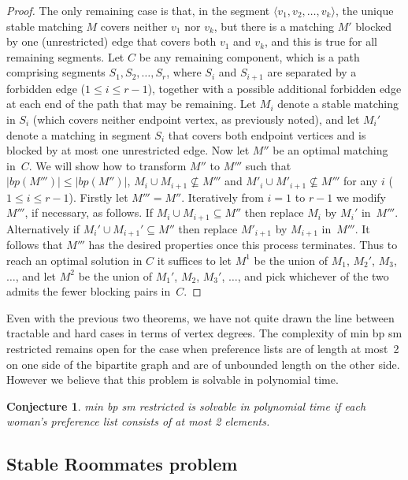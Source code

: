 \documentclass[preprint,12pt]{elsarticle}
\newtheorem{conj}[theorem]{Conjecture}
\begin{document}
\begin{proof}
The only remaining case is that, in the segment $\langle v_1,v_2,\dots,v_k\rangle$, the unique stable matching $M$ covers neither $v_1$ nor $v_k$, but there is a matching $M'$ blocked by one (unrestricted) edge that covers both $v_1$ and $v_k$, and this is true for all remaining segments. Let $C$ be any remaining component, which is a path comprising segments $S_1,S_2,\dots,S_r$, where $S_i$ and $S_{i+1}$ are separated by a forbidden edge ($1\leq i\leq r-1$), together with a possible additional forbidden edge at each end of the path that may be remaining.  Let $M_i$ denote a stable matching in $S_i$ (which covers neither endpoint vertex, as previously noted), and let $M_i'$ denote a matching in segment $S_i$ that covers both endpoint vertices and is blocked by at most one unrestricted edge. Now let $M''$ be an optimal matching in~$C$. We will show how to transform $M''$ to $M'''$ such that $|bp(M''')|\leq |bp(M'')|$, $M_i\cup M_{i+1}\not\subseteq M'''$ and $M'_i\cup M'_{i+1}\not\subseteq M'''$ for any $i$ ($1\leq i\leq r-1$). Firstly let $M'''=M''$.  Iteratively from $i=1$ to $r-1$ we modify $M'''$, if necessary, as follows. If $M_i\cup M_{i+1}\subseteq M''$ then replace $M_i$ by $M_i'$ in~$M'''$.  Alternatively if $M_i'\cup M_{i+1}'\subseteq M''$ then replace $M'_{i+1}$ by $M_{i+1}$ in~$M'''$. It follows that $M'''$ has the desired properties once this process terminates. Thus to reach an optimal solution in $C$ it suffices to let $M^1$ be the union of $M_1$, $M_2'$, $M_3$, $\dots$, and let $M^2$ be the union of $M_1'$, $M_2$, $M_3'$, $\dots$, and pick whichever of the two admits the fewer blocking pairs in~$C$. 
\end{proof}
	
Even with the previous two theorems, we have not quite drawn the line between tractable and hard cases in terms of vertex degrees. The complexity of {\sc min bp sm restricted} remains open for the case when preference lists are of length at most~2 on one side of the bipartite graph and are of unbounded length on the other side. However we believe that this problem is solvable in polynomial time.
	
\begin{conj}
\label{co:2_infty}
	{\sc min bp sm restricted} is solvable in polynomial time if each woman's preference list consists of at most 2 elements.
\end{conj}

\subsection{Stable Roommates problem}
\label{se:sr}
\end{document}
